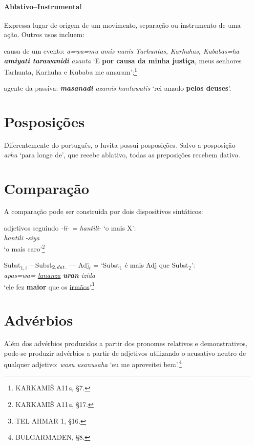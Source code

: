 \paragraph{Ablativo--Instrumental}
Expressa lugar de origem de um movimento, separação ou instrumento de uma ação.
Outros usos incluem:
\begin{inparaenum}[(a)]
	\item causa de um evento:
	\emph{a=wa=mu amis nanis Tarhuntas, Karhuhas, Kubabas=ha
		\textbf{amiyati tara\-wanidi} azanta}
	`E \textbf{por causa da minha justiça}, meus senhores Tarhunta, Kar\-huha e
	Kubaba me amaram';\footnote{KARKAMIŠ A11\emph{a}, §7.}
	\item agente da passiva: \emph{\textbf{masanadi} azamis hantawatis}
	`rei amado
	\textbf{pelos deuses}'.
\end{inparaenum}

\section{Posposições}
Diferentemente do português, o luvita possui posposições.
Salvo a posposição \emph{arha} `para longe de', que recebe ablativo, todas as
preposições recebem dativo.

\section{Comparação}\label{sec:Comparacao}
A comparação pode ser construída por dois dispositivos sintáticos:
\begin{compactenum}[(a)]
	\item adjetivos seguindo \emph{-li- = hantili-} `o mais X':\\
	\emph{hantili -siya}\\ `o mais caro'\footnote{KARKAMIŠ
		A11\emph{a}, §17.}
	\item Subst$_{1,i}$ -- Subst$_{2,\emph{dat.}}$ --- Adj$_i$ = `Subst$_1$ é mais Adj que Subst$_2$':\\
	\emph{apas=wa= \uline{lananza} \textbf{uran}  izida}\\
	`ele  fez \textbf{maior} que os \uline{irmãos}'\footnote{TEL
		AHMAR 1, §16.}
\end{compactenum}


\section{Advérbios}
Além dos advérbios produzidos a partir dos pronomes relativos e demonstrativos,
pode-se produzir advérbios a partir de adjetivos utilizando o acusativo neutro
de qualquer adjetivo: \emph{wasu usanusaha} `eu me aproveitei
bem'.\footnote{BULGARMADEN, §8.}


